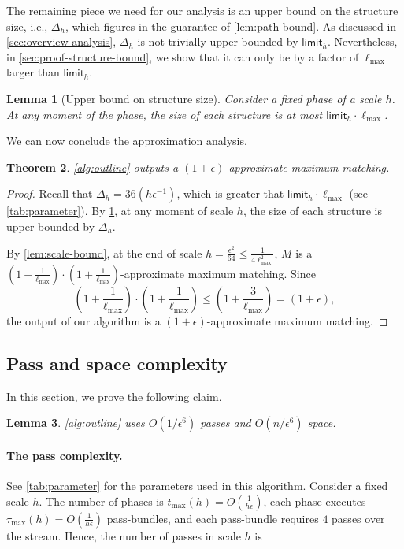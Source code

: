 \documentclass{article}
\newcommand{\eps}{\epsilon}
\newcommand{\lmax}{\ell_{\max}}
\newcommand{\tmax}{t_{\max}}
\newcommand{\taumax}{\tau_{\max}}
\newcommand{\bundle}{\text{pass-bundle}\xspace}
\newcommand{\limit}{\mathsf{limit}}
\newtheorem{theorem}{Theorem}[section]
\newtheorem{lemma}[theorem]{Lemma}
\newcommand{\rb}[1]{\left( #1 \right)}
\begin{document}
The remaining piece we need for our analysis is an upper bound on the structure size, i.e., $\Delta_h$, which figures in the guarantee of \cref{lem:path-bound}. As discussed in \cref{sec:overview-analysis}, $\Delta_h$ is not trivially upper bounded by $\limit_h$.
Nevertheless, in \cref{sec:proof-structure-bound}, we show that it can only be by a factor of $\lmax$ larger than $\limit_h$.
\begin{lemma}[Upper bound on structure size] \label{lem:structure-bound} 
Consider a fixed phase of a scale $h$. At any moment of the phase, the size of each structure is at most $\limit_h \cdot \lmax$. \end{lemma}

We can now conclude the approximation analysis.
\begin{theorem}
    \cref{alg:outline} outputs a $(1+\eps)$-approximate maximum matching.
\end{theorem}
\begin{proof}
Recall that $\Delta_h = 36(h\eps^{-1})$, which is greater that $\limit_h \cdot \lmax$ (see \cref{tab:parameter}). By \cref{lem:structure-bound}, at any moment of scale $h$, the size of each structure is upper bounded by $\Delta_h$.

By \cref{lem:scale-bound}, at the end of scale $h = \frac{\eps^2}{64} \leq \frac{1}{4\lmax^2}$, $M$ is a $\rb{1 + \frac{1}{\lmax}}\cdot \rb{1 + \frac{1}{\lmax}}$-approximate maximum matching. Since 
$$\rb{1 + \frac{1}{\lmax}}\cdot \rb{1 + \frac{1}{\lmax}} \leq \rb{1 + \frac{3}{\lmax}} = (1 + \eps),$$ 
the output of our algorithm is a $(1 + \eps)$-approximate maximum matching.
\end{proof}

\subsection{Pass and space complexity}
In this section, we prove the following claim.
\begin{lemma}
    \cref{alg:outline} uses $O\rb{1/\eps^6}$ passes and $O\rb{n/\eps^6}$ space.
\end{lemma}


\paragraph{The pass complexity.}
See \cref{tab:parameter} for the parameters used in this algorithm. 
Consider a fixed scale $h$. The number of phases is $\tmax(h) = O(\frac{1}{h \eps})$, each phase executes $\taumax(h) = O(\frac{1}{h \eps})$ $\bundle$s, and each $\bundle$ requires $4$ passes over the stream. Hence, the number of passes in scale $h$ is
\end{document}
